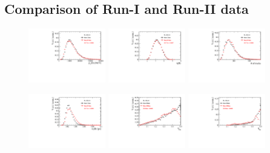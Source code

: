 \clearpage
\subsection{Comparison of Run-I and Run-II data}

\begin{figure}[h]
\centering
\includegraphics[height=!,width=0.3\textwidth]{figs/dataVsMC/run1vs2_norm/Ds2all_Bs_PT.pdf}
\includegraphics[height=!,width=0.3\textwidth]{figs/dataVsMC/run1vs2_norm/Ds2all_Bs_ETA.pdf}
\includegraphics[height=!,width=0.3\textwidth]{figs/dataVsMC/run1vs2_norm/Ds2all_NTracks.pdf}


\includegraphics[height=!,width=0.3\textwidth]{figs/dataVsMC/run1vs2_norm/Ds2all_Bs_BsDTF_TAUERR.pdf}
\includegraphics[height=!,width=0.3\textwidth]{figs/dataVsMC/run1vs2_norm/Ds2all_OS_Combination_PROB.pdf}
\includegraphics[height=!,width=0.3\textwidth]{figs/dataVsMC/run1vs2_norm/Ds2all_SS_Kaon_PROB.pdf}



\end{figure}
